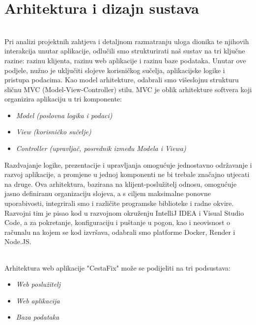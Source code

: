 \chapter{Arhitektura i dizajn sustava}

\noindent \\Pri analizi projektnih zahtjeva i detaljnom razmatranju uloga dionika te njihovih interakcija unutar aplikacije, odlučili smo strukturirati naš sustav na tri ključne razine: razinu klijenta, razinu web aplikacije i razinu baze podataka. Unutar ove podjele, nužno je uključiti slojeve korisničkog sučelja, aplikacijske logike i pristupa podacima. Kao model arhitekture, odabrali smo višeslojnu strukturu sličnu MVC (Model-View-Controller) stilu. MVC je oblik arhitekture softvera koji organizira aplikaciju u tri komponente:

\begin{itemize}
	\item 	\textit{Model (poslovna logika i podaci)}
	\item 	\textit{View (korisničko sučelje)}
	\item 	\textit{Controller (upravljač, posrednik između Modela i Viewa)}
\end{itemize}
\noindent Razdvajanje logike, prezentacije i upravljanja omogućuje jednostavno održavanje i razvoj aplikacije, a promjene u jednoj komponenti ne bi trebale značajno utjecati na druge. Ova arhitektura, bazirana na klijent-poslužitelj odnosu, omogućuje jasno definiranu organizaciju slojeva, a s ciljem maksimalne ponovne uporabivosti, integrirali smo i različite programske biblioteke i radne okvire. Razvojni tim je pisao kod u razvojnom okruženju IntelliJ IDEA i Visual Studio Code, a za pokretanje, konfiguraciju i puštanje u pogon, kao i neovisnost o računalu na kojem se kod izvršava, odabrali smo platforme Docker, Render i Node.JS.


\noindent \\Arhitektura web aplikacije "CestaFix" može se podijeliti na tri podsustava:
\begin{itemize}
	\item 	\textit{Web poslužitelj}
	\item   \textit{Web aplikacija}
	\item   \textit{Baza podataka}
\end{itemize}

